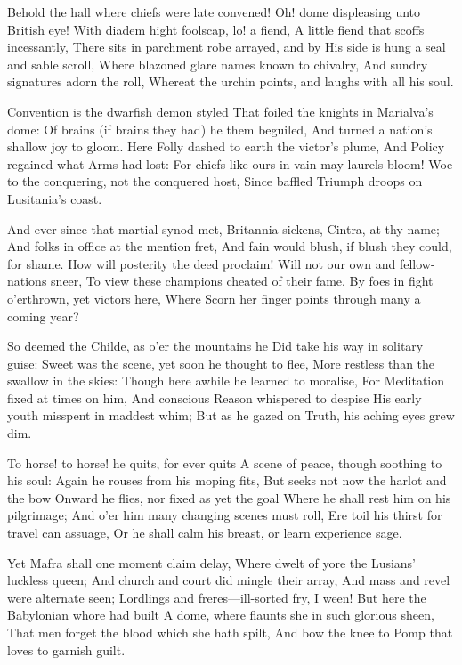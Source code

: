 \documentclass[10pt,twocolumn]{book}
\begin{document}
   Behold the hall where chiefs were late convened!
   Oh! dome displeasing unto British eye!
   With diadem hight foolscap, lo! a fiend,
   A little fiend that scoffs incessantly,
   There sits in parchment robe arrayed, and by
   His side is hung a seal and sable scroll,
   Where blazoned glare names known to chivalry,
   And sundry signatures adorn the roll,
Whereat the urchin points, and laughs with all his soul.

   Convention is the dwarfish demon styled
   That foiled the knights in Marialva's dome:
   Of brains (if brains they had) he them beguiled,
   And turned a nation's shallow joy to gloom.
   Here Folly dashed to earth the victor's plume,
   And Policy regained what Arms had lost:
   For chiefs like ours in vain may laurels bloom!
   Woe to the conquering, not the conquered host,
Since baffled Triumph droops on Lusitania's coast.


   And ever since that martial synod met,
   Britannia sickens, Cintra, at thy name;
   And folks in office at the mention fret,
   And fain would blush, if blush they could, for shame.
   How will posterity the deed proclaim!
   Will not our own and fellow-nations sneer,
   To view these champions cheated of their fame,
   By foes in fight o'erthrown, yet victors here,
Where Scorn her finger points through many a coming year?


   So deemed the Childe, as o'er the mountains he
   Did take his way in solitary guise:
   Sweet was the scene, yet soon he thought to flee,
   More restless than the swallow in the skies:
   Though here awhile he learned to moralise,
   For Meditation fixed at times on him,
   And conscious Reason whispered to despise
   His early youth misspent in maddest whim;
But as he gazed on Truth, his aching eyes grew dim.


   To horse! to horse! he quits, for ever quits
   A scene of peace, though soothing to his soul:
   Again he rouses from his moping fits,
   But seeks not now the harlot and the bow
   Onward he flies, nor fixed as yet the goal
   Where he shall rest him on his pilgrimage;
   And o'er him many changing scenes must roll,
   Ere toil his thirst for travel can assuage,
Or he shall calm his breast, or learn experience sage.


   Yet Mafra shall one moment claim delay,
   Where dwelt of yore the Lusians' luckless queen;
   And church and court did mingle their array,
   And mass and revel were alternate seen;
   Lordlings and freres---ill-sorted fry, I ween!
   But here the Babylonian whore had built
   A dome, where flaunts she in such glorious sheen,
   That men forget the blood which she hath spilt,
And bow the knee to Pomp that loves to garnish guilt.
\end{document}
